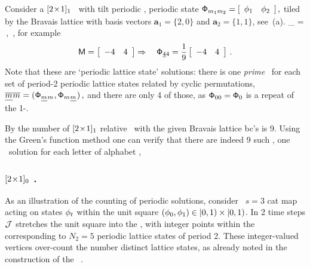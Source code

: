 Consider a ${[2\!\times\!1]_{1}}$ \twot\ with tilt periodic \bcs,
periodic state
\(
\mathsf{\Phi}_{{m_{1}}{m_{2}}} =
 [
 \begin{array}{cc}
 \phi_{1} & \phi_{2}
 \end{array}
 ]
\,,
\)
tiled by the Bravais lattice
 with basis vectors $\mathbf{a}_1=\{2,0\}$ and $\mathbf{a}_2=\{1,1\}$, see \,(a).
\beq
\Xx_{\underline{\Ssym{}}\Ssym{}} = 
        \,,\qquad
\Ssym{}\in\A
         \,,
for example
\[
\Mm =
 \left[
 \begin{array}{cc}
 -4 & 4
 \end{array}
 \right]
 \Rightarrow\quad
\Xx_{\underline{4}4} = \frac{1}{9}
 \left[
 \begin{array}{cc}
 -4 & 4
 \end{array}
 \right]
 \,.
\]
Note that these are `periodic lattice state' solutions: there is one \emph{prime}
\twot\ for each set of period-2 periodic lattice states related by cyclic
permutations,
\(
{\overline{\underline{{m_{}}}{m_{}}}}
    =
(\mathsf{\Phi}_{\underline{{m_{}}}{m_{}}}, \mathsf{\Phi}_{{m_{}}\underline{{m_{}}}})
\,,
\)
and there are only 4 of those, as $\mathsf{\Phi}_{00}=\mathsf{\Phi}_{0}$ is a repeat of the
1-\brick.

By  the number of ${[2\!\times\!1]_{1}}$ relative
\twots\ with the given Bravais lattice bc's is 9.
Using the Green's function method  one can verify
that there are indeed 9 such \twots,
one \twot\ solution for each letter of alphabet ,

\subsubsection{${[2\!\times\!1]_{0}}$ \twot.} %
\label{s:catLatt2cycles}
As an illustration of the {\fundPip} 
counting of periodic solutions, consider \PV\
$s=3$ cat map  acting on states $\phi_{t}$
within the unit square $(\phi_{0},\phi_{1})\in|0,1)\times|0,1)$. In 2
time steps {\jacobianOrb} ${\mathcal{J}}$ %
stretches the
unit square into the {\fundPip}, with integer points within the
{\fundPip} corresponding to $N_2=5$ periodic lattice states
 of period 2. These integer-valued vertices
over-count the number distinct lattice states, as already noted in the
construction of the \tzeta\ \refeq{Isola90-13a}.

